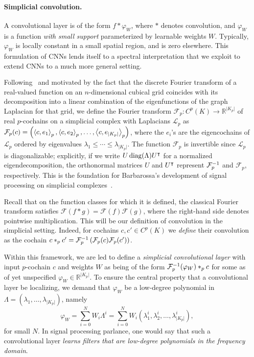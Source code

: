 \paragraph{Simplicial convolution.}

A convolutional layer is of the form $f\ast \varphi_W$, where $\ast$ denotes convolution, and $\varphi_W$ is a function
\emph{with small support} parameterized by learnable weights $W$.
Typically, $\varphi_W$ is locally constant in a small spatial region, and is zero elsewhere. This formulation of CNNs lends itself to a spectral interpretation that we exploit to extend CNNs to a much more general setting.

Following~\cite{defferrard2016convolutional} and motivated by the fact that the discrete Fourier transform of a real-valued function on an $n$-dimensional cubical grid coincides with its decomposition into a linear combination of the eigenfunctions of the graph Laplacian for that grid, we define the Fourier transform $\mathcal{F}_p: C^p(K) \to \mathbb{R}^{\lvert K_p \rvert}$ of real $p$-cochains on a simplicial complex with Laplacians $\mathcal{L}_p$ as $\mathcal{F}_p(c) = \left(\left\langle c , e_1 \right\rangle_p, \left\langle c , e_2 \right\rangle_p, \dotsc, \left\langle c , e_{\lvert K_p \rvert} \right\rangle_p\right)$, where the $e_i$'s are the eigencochains of $\mathcal{L}_p$ ordered by eigenvalues $\lambda_1\leq\dotsm\leq\lambda_{\lvert K_p \rvert}$. The function $\mathcal{F}_p$ is invertible since $\mathcal{L}_p$ is diagonalizable; explicitly, if we write $U\operatorname{diag}(\Lambda)U^{\intercal}$ for a normalized eigendecomposition, the orthonormal matrices $U$ and $U^{\intercal}$ represent $\mathcal{F}^{-1}_p$ and $\mathcal{F}_p$, respectively. This is the foundation for Barbarossa's development of signal processing on simplicial complexes~\cite{barbarossa2018learning}.

Recall that on the function classes for which it is defined, the classical Fourier transform satisfies $\mathcal{F}(f\ast g)=\mathcal{F}(f)\mathcal{F}(g)$, where the right-hand side denotes pointwise multiplication. This will be our definition of convolution in the simplicial setting. Indeed, for cochains $c,c'\in C^p(K)$ we \emph{define} their convolution as the cochain $c\ast_p c' = \mathcal{F}_p^{-1}\left(\mathcal{F}_p(c)\mathcal{F}_p(c')\right)$.

Within this framework, we are led to define a \emph{simplicial convolutional layer} with input $p$-cochain $c$ and weights $W$ as being of the form $\mathcal{F}^{-1}_p(\varphi_W)\ast_p c$ for some as of yet unspecified $\varphi_W\in\mathbb{R}^{\lvert K_p \rvert}$. To ensure the central property that a convolutional layer be localizing, we demand that $\varphi_W$ be a low-degree polynomial in $\Lambda=(\lambda_1, \dotsc, \lambda_{\lvert K_p \rvert})$, namely
\begin{equation*}
  \varphi_W = \sum_{i=0}^N W_i\Lambda^i = \sum_{i=0}^N W_i(\lambda^i_1, \lambda^i_2, \dotsc, \lambda^i_{\lvert K_p \rvert}),
\end{equation*}
for small $N$. In signal processing parlance, one would say that such a convolutional layer \emph{learns filters that are low-degree polynomials in the frequency domain}.


